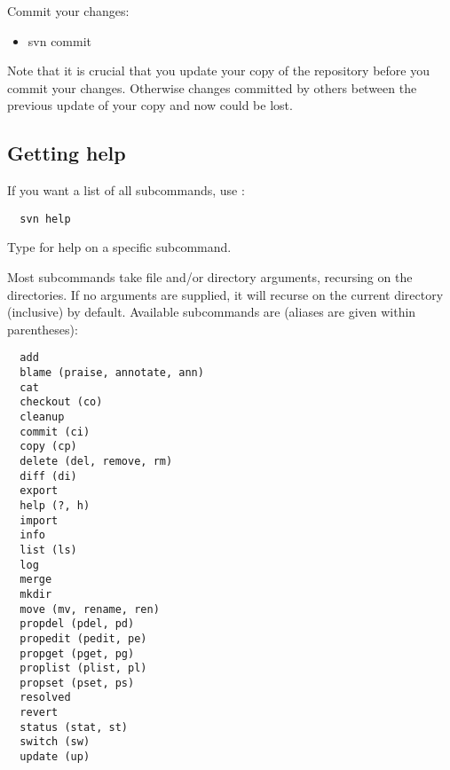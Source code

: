 \documentclass[10pt,a4paper]{simson}
\begin{document}
Commit your changes:
\begin{itemize}
\item svn commit
\end{itemize}

Note that it is crucial that you update your copy of the repository
before you commit your changes. Otherwise changes committed by others
between the previous update of your copy and now could be lost.


\subsection{Getting help}
If you want a list of all  subcommands, use
:
\begin{verbatim}
  svn help
\end{verbatim}
Type  for help on a specific subcommand.

Most subcommands take file and/or directory arguments, recursing on
the directories. If no arguments are supplied, it will recurse on the
current directory (inclusive) by default. Available subcommands are
(aliases are given within parentheses):
\begin{verbatim}
  add
  blame (praise, annotate, ann)
  cat
  checkout (co)
  cleanup
  commit (ci)
  copy (cp)
  delete (del, remove, rm)
  diff (di)
  export
  help (?, h)
  import
  info
  list (ls)
  log
  merge
  mkdir
  move (mv, rename, ren)
  propdel (pdel, pd)
  propedit (pedit, pe)
  propget (pget, pg)
  proplist (plist, pl)
  propset (pset, ps)
  resolved
  revert
  status (stat, st)
  switch (sw)
  update (up)
\end{verbatim}


\end{document}
